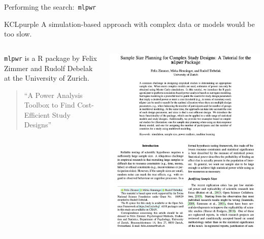 \documentclass[11pt]{beamer}
\begin{document}
\begin{frame}{Performing the search:\ \texttt{mlpwr}}

	\begin{cbox}{KCLpurple}{}
		A simulation-based approach with complex data or models would be too
		slow.
	\end{cbox}

	\begin{columns}
		\begin{column}[c]{0.5\textwidth}
			\texttt{mlpwr} is a R package by Felix Zimmer and Rudolf Debelak at
			the University of Zurich.
			\begin{quote}
				``A Power Analysis Toolbox to Find Cost-Efficient Study Designs''
			\end{quote}
		\end{column}
		\begin{column}[c]{0.5\textwidth}
			\includegraphics[width=\textwidth]{figures/mlpwr_paper.png}
		\end{column}
	\end{columns}

\end{frame}
\end{document}

